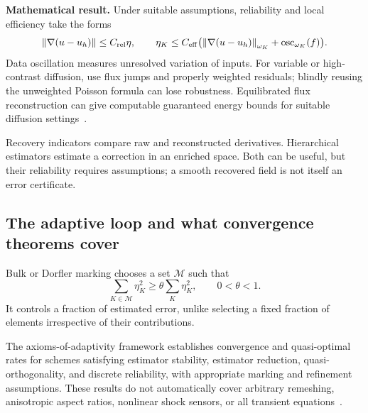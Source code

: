 \documentclass[11pt,a4paper]{article}
\newcommand{\norm}[1]{\left\lVert #1\right\rVert}
\newcommand{\guarantee}{\textcolor{accent}{\textbf{Mathematical result.}} }
\begin{document}
\guarantee Under suitable assumptions, reliability and local efficiency take the forms
\begin{equation}
\norm{\nabla(u-u_h)}\le C_{\rm rel}\eta,
\qquad
\eta_K\le C_{\rm eff}
\bigl(\norm{\nabla(u-u_h)}_{\omega_K}+\mathrm{osc}_{\omega_K}(f)\bigr).
\end{equation}
Data oscillation measures unresolved variation of inputs. For variable or high-contrast diffusion, use flux jumps and properly weighted residuals; blindly reusing the unweighted Poisson formula can lose robustness. Equilibrated flux reconstruction can give computable guaranteed energy bounds for suitable diffusion settings~\cite{bangerth,ern2}.

Recovery indicators compare raw and reconstructed derivatives. Hierarchical estimators estimate a correction in an enriched space. Both can be useful, but their reliability requires assumptions; a smooth recovered field is not itself an error certificate.

\subsection{The adaptive loop and what convergence theorems cover}
\begin{center}
\end{center}
Bulk or Dorfler marking chooses a set $\mathcal M$ such that
\begin{equation}
\sum_{K\in\mathcal M}\eta_K^2\ge\theta\sum_K\eta_K^2,
\qquad 0<\theta<1.
\end{equation}
It controls a fraction of estimated error, unlike selecting a fixed fraction of elements irrespective of their contributions.

The axioms-of-adaptivity framework establishes convergence and quasi-optimal rates for schemes satisfying estimator stability, estimator reduction, quasi-orthogonality, and discrete reliability, with appropriate marking and refinement assumptions. These results do not automatically cover arbitrary remeshing, anisotropic aspect ratios, nonlinear shock sensors, or all transient equations~\cite{axioms}.
\end{document}
